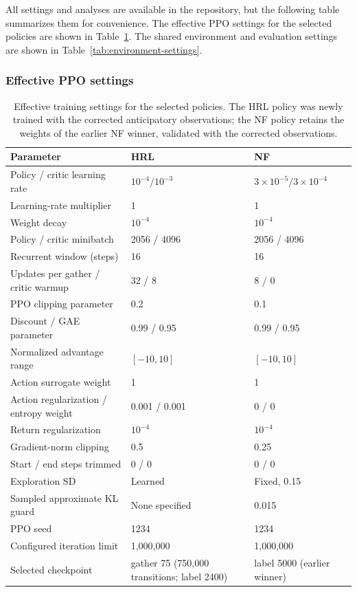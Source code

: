 
All settings and analyses are available in the repository, but the following table summarizes them for convenience. The effective PPO settings for the selected policies are shown in Table~\ref{tab:ppo-settings}. The shared environment and evaluation settings are shown in Table~\ref{tab:environment-settings}.

\subsubsection{Effective PPO settings}



\begin{table}[htbp]
\centering\small
\begin{tabularx}{\linewidth}{@{}Xll@{}}
\toprule
Parameter & HRL & NF\\
\midrule
Policy / critic learning rate & $10^{-4}/10^{-3}$ & $3\times10^{-5}/3\times10^{-4}$\\
Learning-rate multiplier & 1 & 1\\
Weight decay & $10^{-4}$ & $10^{-4}$\\
Policy / critic minibatch & 2056 / 4096 & 2056 / 4096\\
Recurrent window (steps) & 16 & 16\\
Updates per gather / critic warmup & 32 / 8 & 8 / 0\\
PPO clipping parameter & 0.2 & 0.1\\
Discount / GAE parameter & 0.99 / 0.95 & 0.99 / 0.95\\
Normalized advantage range & $[-10,10]$ & $[-10,10]$\\
Action surrogate weight & 1 & 1\\
Action regularization / entropy weight & 0.001 / 0.001 & 0 / 0\\
Return regularization & $10^{-4}$ & $10^{-4}$\\
Gradient-norm clipping & 0.5 & 0.25\\
Start / end steps trimmed & 0 / 0 & 0 / 0\\
Exploration SD & Learned & Fixed, 0.15\\
Sampled approximate KL guard & None specified & 0.015\\
PPO seed & 1234 & 1234\\
Configured iteration limit & 1,000,000 & 1,000,000\\
Selected checkpoint & gather 75 (750,000 transitions; label 2400) & label 5000 (earlier winner)\\
\bottomrule
\end{tabularx}
\caption{Effective training settings for the selected policies. The HRL policy was newly trained with the corrected anticipatory observations; the NF policy retains the weights of the earlier NF winner, validated with the corrected observations.}
\label{tab:ppo-settings}
\end{table}

